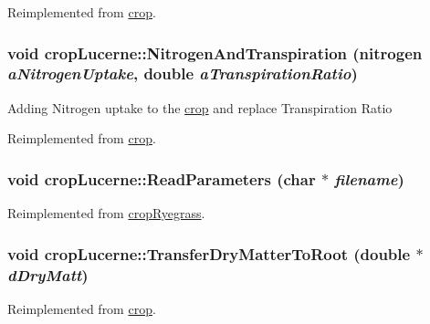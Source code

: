 Reimplemented from \hyperlink{classcrop_aec045be7b4c6fd112b48ead6ee68dcd9}{crop}.\hypertarget{classcrop_lucerne_a021d6c3c1d6951936e97d1a7e900331a}{
\subsubsection[{NitrogenAndTranspiration}]{\setlength{\rightskip}{0pt plus 5cm}void cropLucerne::NitrogenAndTranspiration ({\bf nitrogen} {\em aNitrogenUptake}, \/  double {\em aTranspirationRatio})}}
\label{classcrop_lucerne_a021d6c3c1d6951936e97d1a7e900331a}
Adding Nitrogen uptake to the \hyperlink{classcrop}{crop} and replace Transpiration Ratio 

Reimplemented from \hyperlink{classcrop_a4ed6aaf98890015fb52d4d8957313166}{crop}.\hypertarget{classcrop_lucerne_a6eebd1599c5ae746d05fdae4c82c60fb}{
\subsubsection[{ReadParameters}]{\setlength{\rightskip}{0pt plus 5cm}void cropLucerne::ReadParameters (char $\ast$ {\em filename})}}
\label{classcrop_lucerne_a6eebd1599c5ae746d05fdae4c82c60fb}


Reimplemented from \hyperlink{classcrop_ryegrass_a0bcd3f5b23b82810d40e2bf089755447}{cropRyegrass}.\hypertarget{classcrop_lucerne_a6c87366e1282653cb964ca4c96ab8731}{
\subsubsection[{TransferDryMatterToRoot}]{\setlength{\rightskip}{0pt plus 5cm}void cropLucerne::TransferDryMatterToRoot (double $\ast$ {\em dDryMatt})}}
\label{classcrop_lucerne_a6c87366e1282653cb964ca4c96ab8731}


Reimplemented from \hyperlink{classcrop_aeb0993f2a6d2f21d30a5c24bbd46833e}{crop}.

